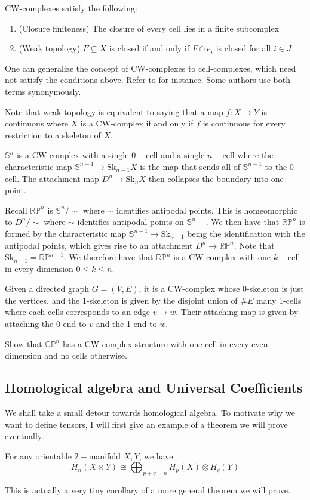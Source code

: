 \documentclass[12pt,reqno]{amsart}
\numberwithin{theorem}{section}
\theoremstyle{definition}
\theoremstyle{remark}
\numberwithin{equation}{section}
\newcommand{\C}{\mathbb C}
\renewcommand{\S}{\mathbb S}
\renewcommand{\P}{\mathbb{P}}
\theoremstyle{definition}
\newcommand{\R}{\mathbb{R}}
\newcommand{\Sk}{\mathrm{Sk}}
\begin{document}
CW-complexes satisfy the following:
\begin{enumerate}
    \item (Closure finiteness) The closure of every cell lies in a finite subcomplex
    \item (Weak topology) $F\subseteq X$ is closed if and only if $F \cap \bar e_i$ is closed for all $i \in J$
\end{enumerate}
\begin{remark}
    One can generalize the concept of CW-complexes to cell-complexes, which need not satisfy the conditions above. Refer to \cite{cadek} for instance. Some authors use both terms synonymously.
\end{remark}
Note that weak topology is equivalent to saying that a map $f:X \rightarrow Y$ is continuous where $X$ is a CW-complex if and only if $f$ is continuous for every restriction to a skeleton of $X$.
\begin{example}
    $\S^n$ is a CW-complex with a single $0-$cell and a single $n-$cell where the characteristic map $\S^{n-1} \rightarrow \Sk_{n-1}X$ is the map that sends all of $\S^{n-1}$ to the $0-$cell. The attachment map $D^n \rightarrow \Sk_n X$ then collapses the boundary into one point.
\end{example}
\begin{example}
    Recall $\R\P^n$ is $\S^n/\sim$ where $\sim$ identifies antipodal points. This is homeomorphic to $D^n/\sim$ where $\sim$ identifies antipodal points on $\S^{n-1}$. We then have that $\R\P^n$ is formed by the characteristic map $\S^{n-1} \rightarrow \Sk_{n-1}$ being the identification with the antipodal points, which gives rise to an attachment $D^n \rightarrow \R\P^n$. Note that $\Sk_{n-1} = \R\P^{n-1}$. We therefore have that $\R\P^n$ is a CW-complex with one $k-$cell in every dimension $0 \leq k \leq n$.
\end{example}
\begin{example}
    Given a directed graph $G=(V,E)$, it is a CW-complex whose 0-skeleton is just the vertices, and the 1-skeleton is given by the disjoint union of $\#E$ many 1-cells where each cells corresponds to an edge $v\rightarrow w$. Their attaching map is given by attaching the 0 end to $v$ and the 1 end to $w$. 
\end{example}
\begin{exercise}
    Show that $\C\P^n$ has a CW-complex structure with one cell in every even dimension and no cells otherwise.
\end{exercise}
\subsection{Homological algebra and Universal Coefficients}
We shall take a small detour towards homological algebra. To motivate why we want to define tensors, I will first give an example of a theorem we will prove eventually.
\begin{theorem}
For any orientable $2-$manifold $X,Y$, we have
    $$H_n(X\times Y) \cong \bigoplus_{p+q=n} H_p(X) \otimes H_q(Y)$$
\end{theorem}
This is actually a very tiny corollary of a more general theorem we will prove.
\end{document}
